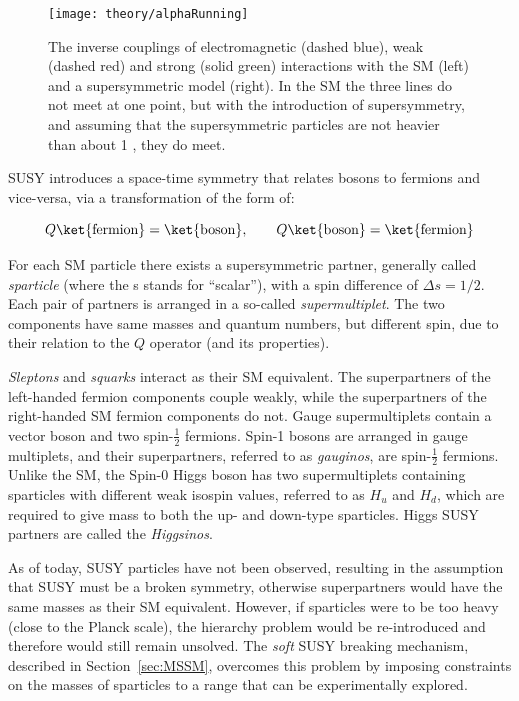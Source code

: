 		\begin{figure}[!htb]
			\centering
			\texttt{[image: theory/alphaRunning]}
			\caption{\label{fig:alphaRunning} The inverse couplings of electromagnetic (dashed blue), weak (dashed red) and strong (solid green) interactions with the \ac{SM} (left) and a supersymmetric model (right). In the \ac{SM} the three lines do not meet at one point, but with the introduction of supersymmetry, and assuming that the supersymmetric particles are not heavier than about 1 \TeV, they do meet.}
		\end{figure}		

		\ac{SUSY} introduces a space-time symmetry that relates bosons to fermions and vice-versa, via a transformation of the form of:  

		\begin{equation}
		\label{eq:susy_transformation}
			Q \ket{\mathrm{fermion}} = \ket{\mathrm{boson}}, \qquad Q \ket{\mathrm{boson}} = \ket{\mathrm{fermion}}
		\end{equation}

		\noindent For each \ac{SM} particle there exists a supersymmetric partner, generally called \textit{sparticle} (where the s stands for “scalar”), with a spin difference of $\Delta s = 1/2$. Each pair of partners is arranged in a so-called \textit{supermultiplet}. The two components have same masses and quantum numbers, but different spin, due to their relation to the $Q$ operator (and its properties). 

		\textit{Sleptons} and \textit{squarks} interact as their \ac{SM} equivalent. The superpartners of the left-handed fermion components couple weakly, while the superpartners of the right-handed \ac{SM} fermion components do not. 
		Gauge supermultiplets contain a vector boson and two spin-$\frac{1}{2}$ fermions. Spin-1 bosons are arranged in gauge multiplets, and their superpartners, referred to as \textit{gauginos}, are spin-$\frac{1}{2}$ fermions. Unlike the \ac{SM}, the Spin-0 Higgs boson has two supermultiplets containing sparticles with different weak isospin values, referred to as $H_u$ and $H_d$, which are required to give mass to both the up- and down-type sparticles. Higgs \ac{SUSY} partners are called the \textit{Higgsinos}.

		As of today, \ac{SUSY} particles have not been observed, resulting in the assumption that \ac{SUSY} must be a broken symmetry, otherwise superpartners would have the same masses as their \ac{SM} equivalent. However, if sparticles were to be too heavy (close to the Planck scale), the hierarchy problem would be re-introduced and therefore would still remain unsolved. The \emph{soft} \ac{SUSY} breaking mechanism, described in Section~\ref{sec:MSSM}, overcomes this problem by imposing constraints on the masses of sparticles to a range that can be experimentally explored. 		


